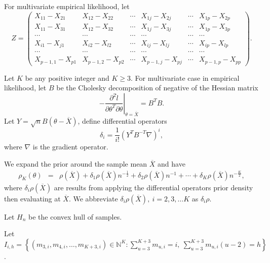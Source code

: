 For multivariate empirical likelihood, let 
\[
Z=\left(\begin{array}{cccccc}
X_{11}-X_{21} & X_{12}-X_{22} & \cdots & X_{1j}-X_{2j} & \cdots & X_{1p}-X_{2p}\\
X_{11}-X_{31} & X_{12}-X_{32} & \cdots & X_{1j}-X_{3j} & \cdots & X_{1p}-X_{3p}\\
\cdots & \cdots & \cdots & \cdots & \cdots & \cdots\\
X_{i1}-X_{j1} & X_{i2}-X_{l2} & \cdots & X_{ij}-X_{lj} & \cdots & X_{ip}-X_{lp}\\
\cdots & \cdots & \cdots & \cdots & \cdots & \cdots\\
X_{p-1,1}-X_{p1} & X_{p-1,2}-X_{p2} & \cdots & X_{p-1,j}-X_{pj} & \cdots & X_{p-1,p}-X_{pp}
\end{array}\right).
\]


Let $K$ be any positive integer and $K\ge3$. For multivariate case
in empirical likelihood, let $B$ be the Cholesky decomposition of
negative of the Hessian matrix 
\[
-\left.\frac{\partial^{2}\hat{l}}{\partial\theta^{T}\partial\theta}\right|_{\theta=\overline{X}}=B^{T}B.
\]
Let $Y=\sqrt{n}B\left(\theta-\overline{X}\right)$, define differential
operators 
\[
\delta_{i}=\frac{1}{i!}\left(Y^{T}B^{-T}\nabla\right)^{i},
\]
where $\nabla$ is the gradient operator. 

We expand the prior around the sample mean $\overline{X}$ and have
\begin{eqnarray*}
\rho_{K}\left(\theta\right) & = & \rho\left(\overline{X}\right)+\delta_{1}\rho\left(\overline{X}\right)n^{-\frac{1}{2}}+\delta_{2}\rho\left(\overline{X}\right)n^{-1}+\cdots+\delta_{K}\rho\left(\overline{X}\right)n^{-\frac{K}{2}},
\end{eqnarray*}
where $\delta_{i}\rho\left(\overline{X}\right)$ are results from
applying the differential operators prior density then evaluating
at $\overline{X}$. We abbreviate $\delta_{i}\rho\left(\overline{X}\right),\: i=2,3,\ldots K$
as $\delta_{i}\rho$.

\begin{comment}
add multivariate case coefficients
\end{comment}


Let $H_{n}$ be the convex hull of samples. 

Let $I_{i,h}=\left\{ \left(m_{3,i},m_{4,i},\ldots,m_{K+3,i}\right)\in\mathbb{N}^{K}:\sum_{u=3}^{K+3}m_{u,i}=i,\:\sum_{u=3}^{K+3}m_{u,i}\left(u-2\right)=h\right\} $.

